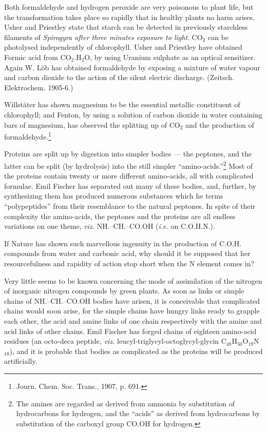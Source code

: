 \documentclass[a4paper, 12pt, oneside]{article}
\begin{document}
Both formaldehyde and hydrogen peroxide are very poisonous to plant life, but the transformation takes place so rapidly that in healthy plants no harm arises. Usher and Priestley state that starch can be detected in previously starchless filaments of \emph{Spirogyra after three minutes exposure to light}. CO$_{2}$ can be photolysed independently of chlorophyll. Usher and Priestley have obtained Formic acid from CO$_{2}$.H$_{2}$O, by using Uranium sulphate as an optical sensitizer. Again W. Löb has obtained formaldehyde by exposing a mixture of water vapour and carbon dioxide to the action of the silent electric discharge. (Zeitsch. Elektrochem. 1905-6.)

Willstäter has shown magnesium to be the essential metallic constituent of chlorophyll; and Fenton, by using a solution of carbon dioxide in water containing bars of magnesium, has observed the splitting up of CO$_{2}$ and the production of formaldehyde.\footnote{Journ. Chem. Soc. Trans., 1907, p. 691.}

Proteins are split up by digestion into simpler bodies --- the peptones, and the latter can be split (by hydrolysis) into the still simpler ``amino-acids.''\footnote{The amines are regarded as derived from ammonia by substitution of hydrocarbons for hydrogen, and the ``acids'' as derived from hydrocarbons by substitution of the carboxyl group CO.OH for hydrogen.} Most of the proteins contain twenty or more different amino-acids, all with complicated formulae. Emil Fischer has separated out many of these bodies, and, further, by synthesizing them has produced numerous substances which he terms ``polypeptides'' from their resemblance to the natural peptones. In spite of their complexity the amino-acids, the peptones and the proteins are all endless variations on one theme, \emph{viz.} NH.--CH.--CO.OH (\emph{i.e.} on C.O.H.N.).

If Nature has shown such marvellous ingenuity in the production of C.O.H. compounds from water and carbonic acid, why should it be supposed that her resourcefulness and rapidity of action stop short when the N element comes in?

Very little seems to be known concerning the mode of assimilation of the nitrogen of inorganic nitrogen compounds by green plants. As soon as links or simple chains of NH.--CH.--CO.OH bodies have arisen, it is conceivable that complicated chains would soon arise, for the simple chains have hungry links ready to grapple each other, the acid and amine links of one chain respectively with the amine and acid links of other chains. Emil Fischer has forged chains of eighteen amino-acid residues (an octo-deca peptide, \emph{viz.} leucyl-triglycyl-octoglycyl-glycin C$_{48}$H$_{50}$O$_{19}$N$_{18}$), and it is probable that bodies as complicated as the proteins will be produced artificially.
\end{document}

